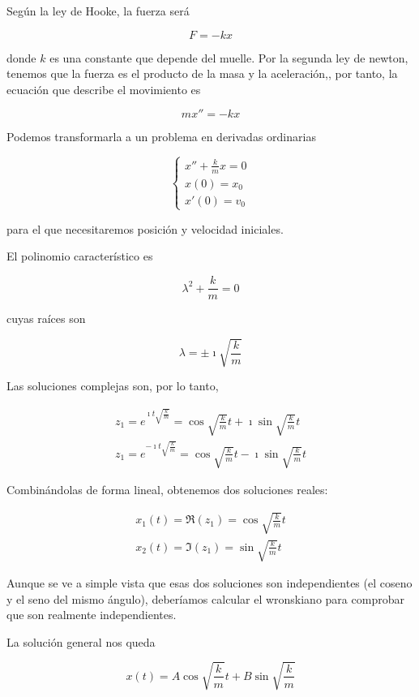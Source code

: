 \documentclass{mathnotes}
\begin{document}
Según la ley de Hooke, la fuerza será

\[ F = -kx \]

donde $k$ es una constante que depende del muelle. Por la segunda ley de newton, tenemos que la fuerza es el producto de la masa y la aceleración,, por tanto, la ecuación que describe el movimiento es 

\[ mx'' = -kx \]

Podemos transformarla a un problema en derivadas ordinarias

$$\left\lbrace \begin{array}{l}
x'' + \frac{k}{m}x = 0\\
x(0) = x_0\\
x'(0) = v_0
\end{array}\right. $$

para el que necesitaremos posición y velocidad iniciales. 

El polinomio característico es

\[ λ^2 + \frac{k}{m} = 0 \]

cuyas raíces son 

\[ λ=\pm \imath \sqrt{\frac{k}{m}} \]

Las soluciones complejas son, por lo tanto,

\begin{gather*}
z_1 = e^{\imath t\sqrt{\frac{k}{m}}} = \cos \sqrt{\frac{k}{m}} t + \imath\sin \sqrt{\frac{k}{m}} t \\
z_1 = e^{-\imath t\sqrt{\frac{k}{m}}} = \cos \sqrt{\frac{k}{m}} t - \imath\sin \sqrt{\frac{k}{m}} t 
\end{gather*}

Combinándolas de forma lineal, obtenemos dos soluciones reales:

\begin{gather*}
x_1(t) = \Re (z_1) = \cos \sqrt{\frac{k}{m}} t \\
x_2(t) = \Im (z_1) = \sin \sqrt{\frac{k}{m}} t
\end{gather*}

Aunque se ve a simple vista que esas dos soluciones son independientes (el coseno y el seno del mismo ángulo), deberíamos calcular el wronskiano para comprobar que son realmente independientes.

La solución general nos queda

\begin{equation}\label{eqMasaResorte} x(t) = A\cos \sqrt{\frac{k}{m}} t + B \sin \sqrt{\frac{k}{m}} 
\end{equation}
\end{document}
